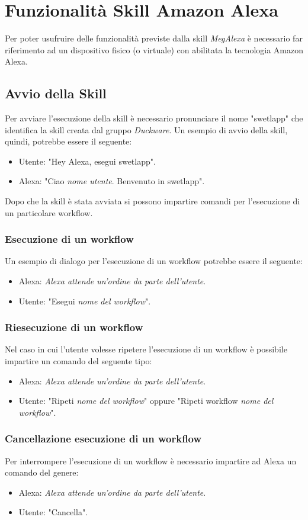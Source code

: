 \section{Funzionalità Skill Amazon Alexa}
\label{sec:sec_interazione_amazon_alexa}
Per poter usufruire delle funzionalità previste dalla skill \textit{MegAlexa} è necessario far riferimento ad un dispositivo fisico (o virtuale) con abilitata la tecnologia Amazon Alexa.
\subsection{Avvio della Skill}
Per avviare l'esecuzione della skill è necessario pronunciare il nome "swetlapp" che identifica la skill creata dal gruppo \textit{Duckware}. Un esempio di avvio della skill, quindi, potrebbe essere il seguente:
\begin{itemize}
	\item Utente: "Hey Alexa, esegui swetlapp".
	\item Alexa: "Ciao \textit{nome utente}. Benvenuto in swetlapp".
\end{itemize}
Dopo che la skill è stata avviata si possono impartire comandi per l'esecuzione di un particolare workflow.
\subsubsection{Esecuzione di un workflow}
Un esempio di dialogo per l'esecuzione di un workflow potrebbe essere il seguente:
\begin{itemize}
	\item Alexa: \textit{Alexa attende un'ordine da parte dell'utente}.
	\item Utente: "Esegui \textit{nome del workflow}".
\end{itemize}
\subsubsection{Riesecuzione di un workflow}
Nel caso in cui l'utente volesse ripetere l'esecuzione di un workflow è possibile impartire un comando del seguente tipo:
\begin{itemize}
	\item Alexa: \textit{Alexa attende un'ordine da parte dell'utente}.
	\item Utente: "Ripeti \textit{nome del workflow}" oppure "Ripeti workflow \textit{nome del workflow}".
\end{itemize}
\subsubsection{Cancellazione esecuzione di un workflow}
Per interrompere l'esecuzione di un workflow è necessario impartire ad Alexa un comando del genere:
\begin{itemize}
	\item Alexa: \textit{Alexa attende un'ordine da parte dell'utente}.
	\item Utente: "Cancella".
\end{itemize}
